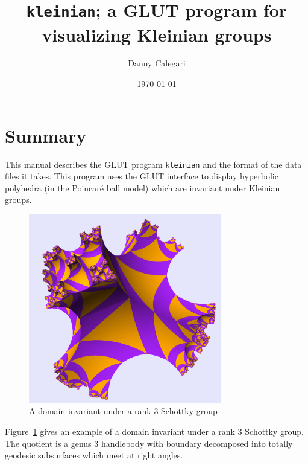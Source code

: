 \documentclass[12pt]{article}
\begin{document}
\title{{\tt kleinian}; a GLUT program for visualizing Kleinian groups}

\author{Danny Calegari}
\date{\today}



\maketitle
\setcounter{tocdepth}{1}
\tableofcontents

\section{Summary}
This manual describes the GLUT program {\tt kleinian} and the 
format of the data files it takes. This program uses the GLUT
interface to display hyperbolic polyhedra (in the Poincar\'e ball model)
which are invariant under Kleinian groups. 

\begin{figure}[ht]
\centering
\includegraphics[width=0.75\textwidth]{example_pictures/schottky}
\caption{A domain invariant under a rank 3 Schottky group}\label{schottky}
\end{figure}

Figure~\ref{schottky} gives an example of a domain invariant under
a rank 3 Schottky group. The quotient is a genus 3 handlebody with
boundary decomposed into totally geodesic subsurfaces which meet at right
angles.
\end{document}
